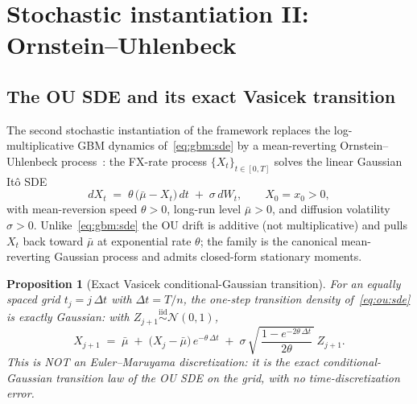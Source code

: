 \documentclass[11pt,letterpaper]{article}
\newtheorem{proposition}{Proposition}[section]
\begin{document}
\section{Stochastic instantiation II: Ornstein--Uhlenbeck}
\label{sec:ou}

\subsection{The OU SDE and its exact Vasicek transition}
\label{sec:ou:sde}

The second stochastic instantiation of the framework replaces the
log-multiplicative GBM dynamics of~\eqref{eq:gbm:sde} by a mean-reverting
Ornstein--Uhlenbeck process~\cite{vasicek-1977, karatzas-shreve-1991}: the
FX-rate process $\{X_{t}\}_{t \in [0, T]}$ solves the linear Gaussian
Itô SDE
\begin{equation}
    dX_{t} \;=\; \theta\,\bigl(\bar\mu - X_{t}\bigr)\,dt
                 \;+\; \sigma\,dW_{t},
    \qquad X_{0} = x_{0} > 0,
    \label{eq:ou:sde}
\end{equation}
with mean-reversion speed $\theta > 0$, long-run level
$\bar\mu > 0$, and diffusion volatility $\sigma > 0$. Unlike~\eqref{eq:gbm:sde}
the OU drift is additive (not multiplicative) and pulls $X_{t}$ back toward
$\bar\mu$ at exponential rate $\theta$; the family is the canonical
mean-reverting Gaussian process and admits closed-form stationary moments.

\begin{proposition}[Exact Vasicek conditional-Gaussian transition]
\label{prop:ou:disc}
For an equally spaced grid $t_{j} = j\,\Delta t$ with $\Delta t = T/n$, the
one-step transition density of~\eqref{eq:ou:sde} is exactly Gaussian: with
$Z_{j+1} \stackrel{\text{iid}}{\sim} \mathcal{N}(0, 1)$,
\begin{equation}
    X_{j+1}
    \;=\;
    \bar\mu \;+\; \bigl(X_{j} - \bar\mu\bigr)\,e^{-\theta\,\Delta t}
    \;+\;
    \sigma\,\sqrt{\,\frac{1 - e^{-2\theta\,\Delta t}}{2\theta}\,}\,Z_{j+1}.
    \label{eq:ou:vasicek}
\end{equation}
This is NOT an Euler--Maruyama discretization: it is the exact
conditional-Gaussian transition law of the OU SDE on the grid, with no
time-discretization error.
\end{proposition}
\end{document}
